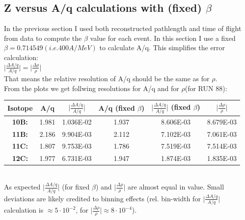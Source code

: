 \documentclass[12pt, letterpaper]{article}
\begin{document}
\subsection{Z versus A/q calculations with (fixed) $\beta$}
In the previous section I used both reconstructed pathlength and time of flight from data to compute the $\beta$ value for each event. In this section I use a fixed $\beta = 0.714549 (i.e. 400 A/MeV)$ to calculate A/q. This simplifies the error calculation:\\
\newline
$\Big|\frac{\Delta A/q}{A/q}\Big| = \Big|\frac{\Delta \rho}{\rho}\Big|$ \\
\newline
That means the relative  resolution of A/q should be the same as for $\rho$.\\
From the plots we get follwing resolutions for A/q and for $\rho$(for RUN 88):\\
\newline
\begin{tabular}{|c|c|c|c|c|c|}
\hline
Isotope & A/q & $\Big|\frac{\Delta A/q}{A/q}\Big|$ & A/q (fixed $\beta$) & $\Big|\frac{\Delta A/q}{A/q}\Big|$ (fixed $\beta$) & $\Big|\frac{\Delta \rho}{\rho}\Big|$ \\
\hline
\textbf{10B:} & 1.981 & 1.036E-02 & 1.937 & 8.606E-03 & 8.679E-03 \\
\hline
\textbf{11B:} & 2.186 & 9.904E-03 & 2.112 & 7.102E-03 & 7.061E-03 \\
\hline
\textbf{11C:} & 1.807 & 9.753E-03 & 1.786 & 7.519E-03 & 7.514E-03\\
\hline
\textbf{12C:} & 1.977 & 6.731E-03 & 1.947 & 1.874E-03 & 1.835E-03\\
\hline
\end{tabular}
\\
\newline
As expected $\Big|\frac{\Delta A/q}{A/q}\Big|$ (for fixed $\beta$) and $\Big|\frac{\Delta \rho}{\rho}\Big|$ are almost equal in value. Small deviations are likely credited to binning effects (rel. bin-width for $\Big|\frac{\Delta A/q}{A/q}\Big|$ calculation is $\approx 5\cdot10^{-2}$, for $\Big|\frac{\Delta \rho}{\rho}\Big| \approx 8 \cdot10^{-4}$).
\end{document}
